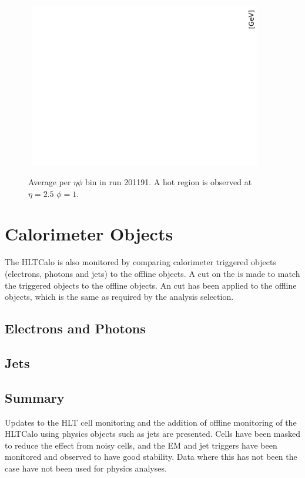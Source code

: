 \begin{figure}
\centering
\mbox{
   \includegraphics[width=0.9\textwidth]{figures/ServiceWork/Cells_HotSpot-Edit.pdf}
}
\caption[Average \et{} for HLT calorimeter cells]{
Average \et{} per $\eta \phi$ bin in run 201191. 
A hot region is observed at $\eta=2.5$ $\phi=1$. 
\label{SW_hotspot}}
\end{figure}



\section{Calorimeter Objects}

The HLTCalo is also monitored by comparing calorimeter triggered objects (electrons, photons and jets) to the offline objects.
A cut on the \dr{} is made to match the triggered objects to the offline objects.
An \et{} cut has been applied to the offline objects, which is the same as required by the analysis selection. 



\subsection{Electrons and Photons}




 
\subsection{Jets}
\label{HLTCalo:Jets}




\subsection{Summary}

Updates to the HLT cell monitoring and the addition of offline monitoring of the HLTCalo using physics objects such as jets are presented.
Cells have been masked to reduce the effect from noisy cells, and the EM and jet triggers have been monitored and observed to have good stability. 
Data where this has not been the case have not been used for physics analyses.
